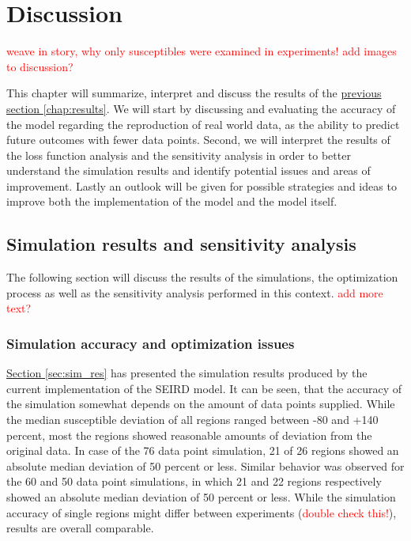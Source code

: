 
\chapter{Discussion} %
\label{chap:discussion} %
\textcolor{red}{weave in story, why only susceptibles were examined in experiments!}
\textcolor{red}{add images to discussion?}


This chapter will summarize, interpret and discuss the results of the \hyperref[chap:results]{previous section
\ref*{chap:results}}. We will start by discussing and evaluating the accuracy of the model regarding the reproduction
of real world data, as the ability to predict future outcomes with fewer data points. Second, we will
interpret the results of the loss function analysis and the sensitivity analysis in order to better understand the simulation
results and identify potential issues and areas of improvement. Lastly an outlook will be given for possible strategies and
ideas to improve both the implementation of the model and the model itself.

\section{Simulation results and sensitivity analysis}
The following section will discuss the results of the simulations, the optimization process as well as the sensitivity
analysis performed in this context.
\textcolor{red}{add more text?}


\subsection{Simulation accuracy and optimization issues}
\hyperref[sec:sim_res]{Section \ref*{sec:sim_res}} has presented the simulation results produced by the current implementation
of the SEIRD model. It can be seen, that the accuracy of the simulation somewhat depends on the amount of data points supplied.
While the median susceptible deviation of all regions ranged between -80 and +140 percent, most the regions showed reasonable
amounts of deviation from the original data. In case of the 76 data point simulation, 21 of 26 regions showed an
absolute median deviation of 50 percent or less. Similar behavior was observed for the 60 and 50 data point simulations, in which
21 and 22 regions respectively showed an absolute median deviation of 50 percent or less. While the simulation accuracy of single regions
might differ between experiments (\textcolor{red}{double check this!}), results are overall comparable.\newline

